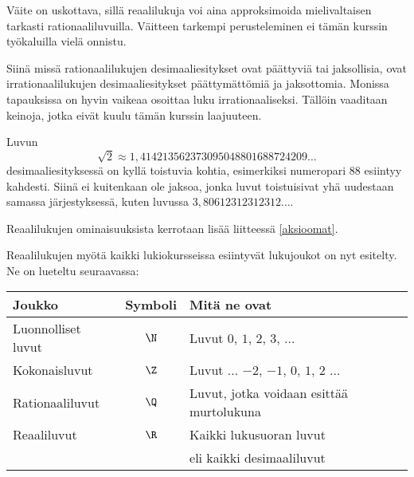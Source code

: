 
Väite on uskottava, sillä reaalilukuja voi aina approksimoida mielivaltaisen tarkasti rationaaliluvuilla. Väitteen tarkempi perusteleminen ei tämän kurssin työkaluilla vielä onnistu.

Siinä missä rationaalilukujen desimaaliesitykset ovat päättyviä tai jaksollisia, ovat irrationaalilukujen desimaaliesitykset päättymättömiä ja
jaksottomia. Monissa tapauksissa on hyvin vaikeaa osoittaa luku irrationaaliseksi. Tällöin vaaditaan keinoja, jotka eivät kuulu tämän kurssin laajuuteen.

Luvun
\[\sqrt{2} \approx 1,414213562373095048801688724209\ldots\]
desimaaliesityksessä on kyllä toistuvia kohtia, esimerkiksi numeropari $88$ esiintyy kahdesti. Siinä ei kuitenkaan ole jaksoa, jonka luvut toistuisivat yhä uudestaan
samassa järjestyksessä, kuten luvussa $3,80612312312312\ldots$.

Reaalilukujen ominaisuuksista kerrotaan lisää liitteessä \ref{aksioomat}.


Reaalilukujen myötä kaikki lukiokursseissa esiintyvät lukujoukot on nyt esitelty. Ne on lueteltu seuraavassa:
\begin{center}\begin{tabular}{l|c|l}
Joukko & Symboli & Mitä ne ovat\\
\hline
Luonnolliset luvut & $\N$ &
Luvut $0$, $1$, $2$, $3$, $\ldots$ \\
Kokonaisluvut & $\Z$ & Luvut $\ldots$ $-2$, $-1$, $0$, $1$, $2$ $\ldots$ \\ 
Rationaaliluvut & $\Q$ & Luvut, jotka voidaan esittää
murtolukuna \\
Reaaliluvut & $\R$ & Kaikki lukusuoran luvut \\
& & eli kaikki desimaaliluvut
\end{tabular} \end{center} 

